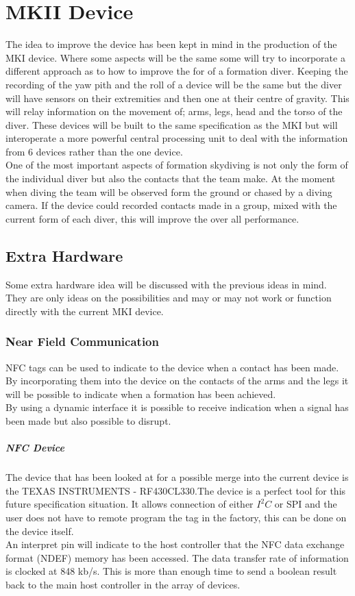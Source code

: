 \documentclass{report}
\begin{document}
  
\section{MKII Device}

The idea to improve the device has been kept in mind in the production of the MKI device. Where some aspects will be the same some will try to incorporate a different approach as to how to improve the for of a formation diver. Keeping the recording of the yaw pith and the roll of a device will be the same but the diver will have sensors on their extremities and then one at their centre of gravity. This will relay information on the movement of; arms, legs, head and the torso of the diver. These devices will be built to the same specification as the MKI but will interoperate a more powerful central processing unit to deal with the information from 6 devices rather than the one device.\\
One of the most important aspects of formation skydiving is not only the form of the individual diver but also the contacts that the team make. At the moment when diving the team will be observed form the ground or chased by a diving camera. If the device could recorded contacts made in a group, mixed with the current form of each diver, this will improve the over all performance.\\

\subsection{Extra Hardware}

Some extra hardware idea will be discussed with the previous ideas in mind. They are only ideas on the possibilities and may or may not work or function directly with the current MKI device.

\subsubsection{Near Field Communication}
NFC tags can be used to indicate to the device when a contact has been made. By incorporating them into the device on the contacts of the arms and the legs it will be possible to indicate when a formation has been achieved.\\
By using a dynamic interface it is possible to receive indication when a signal has been made but also possible to disrupt. 
\subparagraph{NFC Device}
The device that has been looked at for a possible merge into the current device is the TEXAS INSTRUMENTS - RF430CL330.The device is a perfect tool for this future specification situation. It allows connection of either $I^2C$  or SPI and the user does not have to remote program the tag in the factory, this can be done on the device itself.\\
An interpret pin will indicate to the host controller that the NFC data exchange format (NDEF) memory has been accessed. The data transfer rate of information is clocked at 848 kb/s. This is more than enough time to send a boolean result back to the main host controller in the array of devices. 
\end{document}
